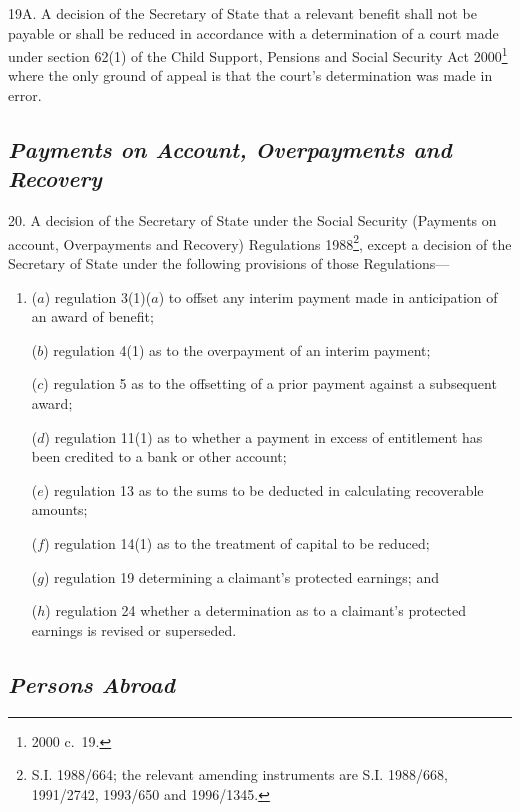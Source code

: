 \documentclass[12pt,a4paper]{article}
\begin{document}
19A.  A decision of the Secretary of State that a relevant benefit shall not be payable or shall be reduced in accordance with a determination of a court made under section 62(1) of the Child Support, Pensions and Social Security Act 2000\footnote{2000 c.\ 19.} where the only ground of appeal is that the court’s determination was made in error.


\subsection*{\itshape Payments on Account, Overpayments and Recovery}

20.  A decision of the Secretary of State under the Social Security (Payments on account, Overpayments and Recovery) Regulations 1988\footnote{\frenchspacing S.I. 1988/664; the relevant amending instruments are S.I. 1988/668, 1991/2742, 1993/650 and 1996/1345.}, except a decision of the Secretary of State under the following provisions of those Regulations—
\begin{enumerate}\item[]
($a$) regulation 3(1)($a$) to offset any interim payment made in anticipation of an award of benefit;

($b$) regulation 4(1) as to the overpayment of an interim payment;

($c$) regulation 5 as to the offsetting of a prior payment against a subsequent award;

($d$) regulation 11(1) as to whether a payment in excess of entitlement has been credited to a bank or other account;

($e$) regulation 13 as to the sums to be deducted in calculating recoverable amounts;

($f$) regulation 14(1) as to the treatment of capital to be reduced;

($g$) regulation 19 determining a claimant’s protected earnings; and

($h$) regulation 24 whether a determination as to a claimant’s protected earnings is revised or superseded.
\end{enumerate}

\subsection*{\itshape Persons Abroad}
\end{document}
